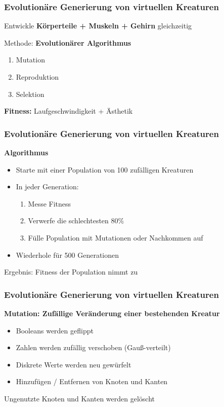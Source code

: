 \documentclass{beamer}
\begin{document}
\begin{frame}
	\frametitle{Evolutionäre Generierung von virtuellen Kreaturen}
	Entwickle \textbf{Körperteile + Muskeln + Gehirn} gleichzeitig\\ \pause
	\vspace{2em}
	
	Methode: \textbf{Evolutionärer Algorithmus} \pause
	\begin{enumerate}
		\item Mutation
		\item Reproduktion
		\item Selektion
	\end{enumerate}
	\pause
	\vspace{2em}
	\textbf{Fitness:} Laufgeschwindigkeit \pause  + Ästhetik
\end{frame}

\begin{frame}
	\frametitle{Evolutionäre Generierung von virtuellen Kreaturen}
	\textbf{Algorithmus}\\
	\vspace{1em}
	\pause
	\begin{itemize}
		\item Starte mit einer Population von 100 zufälligen Kreaturen \pause \\
		\vspace{1em}
		\item In jeder Generation:
		\begin{enumerate}
			\item Messe Fitness
			\item Verwerfe die schlechtesten $80\%$
			\item Fülle Population mit Mutationen oder Nachkommen auf
		\end{enumerate}
		\pause
		\vspace{1em}
		\item Wiederhole für 500 Generationen\\
	\end{itemize}
	\vspace{2em}
	\pause
	Ergebnis: Fitness der Population nimmt zu \checkmark
\end{frame}

\begin{frame}
	\frametitle{Evolutionäre Generierung von virtuellen Kreaturen}
	
	\textbf{Mutation: Zufällige Veränderung einer bestehenden Kreatur}
	\pause
	\vspace{1em}
	\begin{itemize}
		\item Booleans werden geflippt
		\item Zahlen werden zufällig verschoben (Gauß-verteilt)
		\item Diskrete Werte werden neu gewürfelt
		\item Hinzufügen / Entfernen von Knoten und Kanten
	\end{itemize}
	\vspace{2em}
	\pause
	Ungenutzte Knoten und Kanten werden gelöscht
\end{frame}
\end{document}
